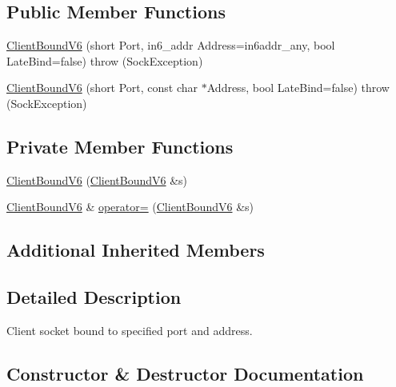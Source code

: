 \subsection*{Public Member Functions}
\begin{DoxyCompactItemize}
\item 
\hyperlink{classClientBoundV6_a139f971557848afbc4201a16f081d441}{Client\+Bound\+V6} (short Port, in6\+\_\+addr Address=in6addr\+\_\+any, bool Late\+Bind=false)  throw (\+Sock\+Exception)
\item 
\hyperlink{classClientBoundV6_a41e5be655ddcf900ba3a166eed533982}{Client\+Bound\+V6} (short Port, const char $\ast$Address, bool Late\+Bind=false)  throw (\+Sock\+Exception)
\end{DoxyCompactItemize}
\subsection*{Private Member Functions}
\begin{DoxyCompactItemize}
\item 
\hyperlink{classClientBoundV6_a997dffff351c17df41e6cf2e8f69d1ee}{Client\+Bound\+V6} (\hyperlink{classClientBoundV6}{Client\+Bound\+V6} \&s)
\item 
\hyperlink{classClientBoundV6}{Client\+Bound\+V6} \& \hyperlink{classClientBoundV6_a0f04bf3652e27ac44ebc8e7694d7fcbe}{operator=} (\hyperlink{classClientBoundV6}{Client\+Bound\+V6} \&s)
\end{DoxyCompactItemize}
\subsection*{Additional Inherited Members}


\subsection{Detailed Description}
Client socket bound to specified port and address. 

\subsection{Constructor \& Destructor Documentation}
\mbox{\label{classClientBoundV6_a139f971557848afbc4201a16f081d441}} 
